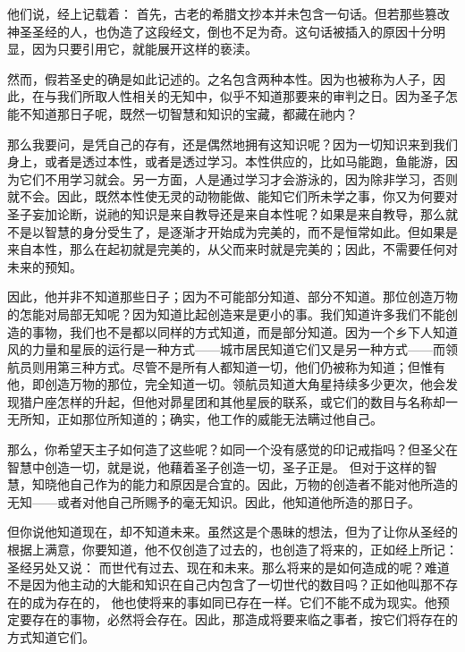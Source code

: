他们说，经上记载着： 首先，古老的希腊文抄本并未包含一句话。但若那些篡改神圣圣经的人，也伪造了这段经文，倒也不足为奇。这句话被插入的原因十分明显，因为只要引用它，就能展开这样的亵渎。\par

然而，假若圣史的确是如此记述的。之名包含两种本性。因为也被称为人子，因此，在与我们所取人性相关的无知中，似乎不知道那要来的审判之日。因为圣子怎能不知道那日子呢，既然一切智慧和知识的宝藏，都藏在祂内？\par

那么我要问，是凭自己的存有，还是偶然地拥有这知识呢？因为一切知识来到我们身上，或者是透过本性，或者是透过学习。本性供应的，比如马能跑，鱼能游，因为它们不用学习就会。另一方面，人是通过学习才会游泳的，因为除非学习，否则就不会。因此，既然本性使无灵的动物能做、能知它们所未学之事，你又为何要对圣子妄加论断，说祂的知识是来自教导还是来自本性呢？如果是来自教导，那么就不是以智慧的身分受生了，是逐渐才开始成为完美的，而不是恒常如此。但如果是来自本性，那么在起初就是完美的，从父而来时就是完美的；因此，不需要任何对未来的预知。\par

因此，他并非不知道那些日子；因为不可能部分知道、部分不知道。那位创造万物的怎能对局部无知呢？因为知道比起创造来是更小的事。我们知道许多我们不能创造的事物，我们也不是都以同样的方式知道，而是部分知道。因为一个乡下人知道风的力量和星辰的运行是一种方式——城市居民知道它们又是另一种方式——而领航员则用第三种方式。尽管不是所有人都知道一切，他们仍被称为知道；但惟有他，即创造万物的那位，完全知道一切。领航员知道大角星持续多少更次，他会发现猎户座怎样的升起，但他对昴星团和其他星辰的联系，或它们的数目与名称却一无所知，正如那位所知道的；确实，他工作的威能无法瞒过他自己。\par

那么，你希望天主子如何造了这些呢？如同一个没有感觉的印记戒指吗？但圣父在智慧中创造一切，就是说，他藉着圣子创造一切，圣子正是。 但对于这样的智慧，知晓他自己作为的能力和原因是合宜的。因此，万物的创造者不能对他所造的无知——或者对他自己所赐予的毫无知识。因此，他知道他所造的那日子。\par

但你说他知道现在，却不知道未来。虽然这是个愚昧的想法，但为了让你从圣经的根据上满意，你要知道，他不仅创造了过去的，也创造了将来的，正如经上所记： 圣经另处又说： 而世代有过去、现在和未来。那么将来的是如何造成的呢？难道不是因为他主动的大能和知识在自己内包含了一切世代的数目吗？正如他叫那不存在的成为存在的， 他也使将来的事如同已存在一样。它们不能不成为现实。他预定要存在的事物，必然将会存在。因此，那造成将要来临之事者，按它们将存在的方式知道它们。\par

